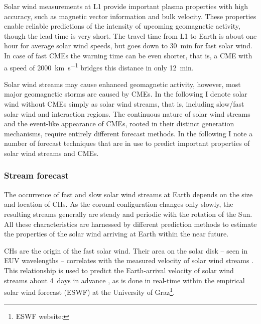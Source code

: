 Solar wind measurements at L1 provide important plasma properties with high accuracy, such as magnetic vector information and bulk velocity. These properties enable reliable predictions of the intensity of upcoming geomagnetic activity, though the lead time is very short. The travel time from L1 to Earth is about one hour for average solar wind speeds, but goes down to \SI{30}{\minute} for fast solar wind. In case of fast CMEs the warning time can be even shorter, that is, a CME with a speed of \SI{2000}{\km\per\s} bridges this distance in only \SI{12}{\minute}.

Solar wind streams may cause enhanced geomagnetic activity, however, most major geomagnetic storms are caused by CMEs. In the following I denote solar wind without CMEs simply as solar wind streams, that is, including slow/fast solar wind and interaction regions. The continuous nature of solar wind streams and the event-like appearance of CMEs, rooted in their distinct generation mechanisms, require entirely different forecast methods. In the following I note a number of forecast techniques that are in use to predict important properties of solar wind streams and CMEs.

\subsubsection*{Stream forecast}
The occurrence of fast and slow solar wind streams at Earth depends on the size and location of CHs. As the coronal configuration changes only slowly, the resulting streams generally are steady and periodic with the rotation of the Sun. All these characteristics are harnessed by different prediction methods to estimate the properties of the solar wind arriving at Earth within the near future.

CHs are the origin of the fast solar wind. Their area on the solar disk -- seen in EUV wavelengths -- correlates with the measured velocity of solar wind streams \citep{Vrsnak2007}. This relationship is used to predict the Earth-arrival velocity of solar wind streams about 4~days in advance \citep{Rotter2012}, as is done in real-time within the empirical solar wind forecast (ESWF) at the University of Graz\footnote{ESWF website: }.

